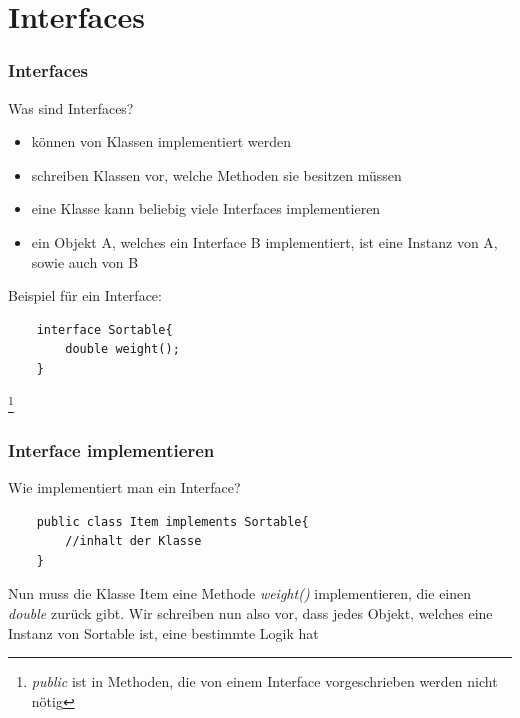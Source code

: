 \section{Interfaces}

\begin{frame}[fragile] %
\frametitle{Interfaces}
Was sind Interfaces?
\begin{itemize}
    \item können von Klassen implementiert werden
    \item schreiben Klassen vor, welche Methoden sie besitzen müssen
    \item eine Klasse kann beliebig viele Interfaces implementieren
    \item ein Objekt A, welches ein Interface B implementiert, ist eine Instanz von A, sowie auch von B
\end{itemize}
Beispiel für ein Interface:
\begin{lstlisting}
    interface Sortable{
        double weight();
    }
\end{lstlisting}\footnote{\textit{public} ist in Methoden, die von einem Interface vorgeschrieben werden nicht nötig}
\end{frame}

\begin{frame}[fragile]
\frametitle{Interface implementieren}
Wie implementiert man ein Interface?
\begin{lstlisting}
    public class Item implements Sortable{
        //inhalt der Klasse
    }
\end{lstlisting}
Nun muss die Klasse Item eine Methode \textit{weight()} implementieren, die einen \textit{double} zurück gibt.
\newline
Wir schreiben nun also vor, dass jedes Objekt, welches eine Instanz von Sortable ist, eine bestimmte Logik hat
\end{frame}

